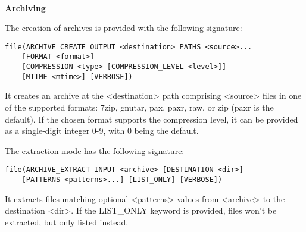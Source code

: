 \hspace*{\fill} \\ %
\noindent
\textbf{Archiving}

The creation of archives is provided with the following signature:

\begin{lstlisting}[style=styleCMake]
file(ARCHIVE_CREATE OUTPUT <destination> PATHS <source>...
	[FORMAT <format>]
	[COMPRESSION <type> [COMPRESSION_LEVEL <level>]]
	[MTIME <mtime>] [VERBOSE])
\end{lstlisting}

It creates an archive at the <destination> path comprising <source> files in one of the supported formats: 7zip, gnutar, pax, paxr, raw, or zip (paxr is the default). If the chosen format supports the compression level, it can be provided as a single-digit integer 0-9, with 0 being the default.

The extraction mode has the following signature:

\begin{lstlisting}[style=styleCMake]
file(ARCHIVE_EXTRACT INPUT <archive> [DESTINATION <dir>]
	[PATTERNS <patterns>...] [LIST_ONLY] [VERBOSE])
\end{lstlisting}

It extracts files matching optional <patterns> values from <archive> to the destination <dir>. If the LIST\_ONLY keyword is provided, files won't be extracted, but only listed instead.



